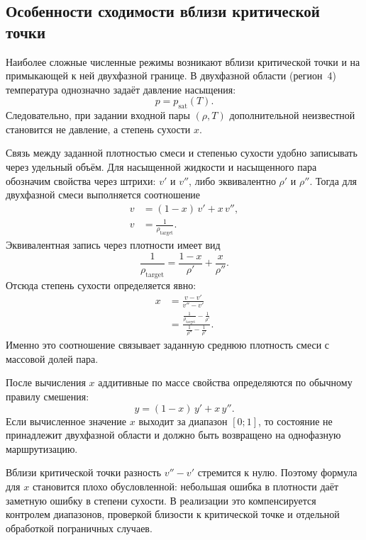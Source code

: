 \subsection{Особенности сходимости вблизи критической точки}

Наиболее сложные численные режимы
возникают вблизи критической точки
и на примыкающей к ней двухфазной границе.
В двухфазной области (регион~4)
температура однозначно задаёт давление насыщения:
\begin{equation}
p = p_{\mathrm{sat}}(T).
\end{equation}
Следовательно, при задании входной пары $(\rho, T)$
дополнительной неизвестной становится не давление,
а степень сухости $x$.

Связь между заданной плотностью смеси
и степенью сухости удобно записывать
через удельный объём.
Для насыщенной жидкости и насыщенного пара
обозначим свойства через штрихи:
$v'$ и $v''$, либо эквивалентно $\rho'$ и $\rho''$.
Тогда для двухфазной смеси выполняется соотношение
\begin{equation}
\begin{aligned}
v &= (1-x)\,v' + x\,v'', \\
v &= \frac{1}{\rho_{\mathrm{target}}}.
\end{aligned}
\end{equation}
Эквивалентная запись через плотности имеет вид
\begin{equation}
\frac{1}{\rho_{\mathrm{target}}}
=
\frac{1-x}{\rho'}
+
\frac{x}{\rho''}.
\end{equation}
Отсюда степень сухости определяется явно:
\begin{equation}
\begin{aligned}
x &= \frac{v - v'}{v'' - v'} \\
&= \frac{\frac{1}{\rho_{\mathrm{target}}} - \frac{1}{\rho'}}
{\frac{1}{\rho''} - \frac{1}{\rho'}}.
\end{aligned}
\end{equation}
Именно это соотношение
связывает заданную среднюю плотность смеси
с массовой долей пара.

После вычисления $x$
аддитивные по массе свойства
определяются по обычному правилу смешения:
\begin{equation}
y = (1-x)\,y' + x\,y''.
\end{equation}
Если вычисленное значение $x$
выходит за диапазон $[0; 1]$,
то состояние не принадлежит двухфазной области
и должно быть возвращено на однофазную маршрутизацию.

Вблизи критической точки
разность $v''-v'$ стремится к нулю.
Поэтому формула для $x$
становится плохо обусловленной:
небольшая ошибка в плотности
даёт заметную ошибку в степени сухости.
В реализации это компенсируется
контролем диапазонов,
проверкой близости к критической точке
и отдельной обработкой пограничных случаев.

